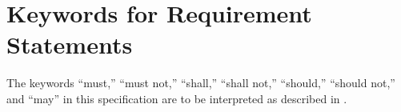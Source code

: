 \section{Keywords for Requirement Statements}\label{keywords-for-requirement-statements}

The keywords ``must,'' ``must not,'' ``shall,'' ``shall not,''
``should,'' ``should not,'' and ``may'' in this specification are to be
interpreted as described in \cite{RFC2119}.

% 
% 
% 
% 
% 
% 
% 
% 
% 
% 
% 
% 


